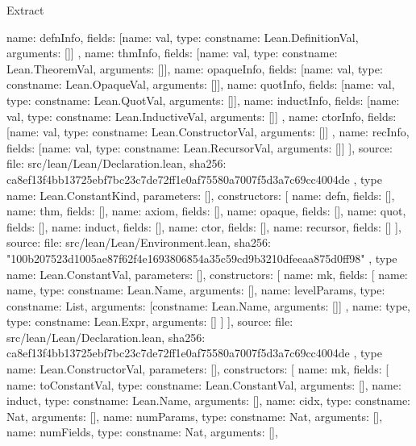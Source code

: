 \begin{lexlean}{Extract}
\begin{toolingmodule}
{{        {
          name: defnInfo,
          fields: [{name: val, type: const{name: Lean.DefinitionVal, arguments: []}}]
        },
        {name: thmInfo, fields: [{name: val, type: const{name: Lean.TheoremVal, arguments: []}}]},
        {name: opaqueInfo, fields: [{name: val, type: const{name: Lean.OpaqueVal, arguments: []}}]},
        {name: quotInfo, fields: [{name: val, type: const{name: Lean.QuotVal, arguments: []}}]},
        {
          name: inductInfo,
          fields: [{name: val, type: const{name: Lean.InductiveVal, arguments: []}}]
        },
        {
          name: ctorInfo,
          fields: [{name: val, type: const{name: Lean.ConstructorVal, arguments: []}}]
        },
        {name: recInfo, fields: [{name: val, type: const{name: Lean.RecursorVal, arguments: []}}]}
      ],
      source: {
        file: src/lean/Lean/Declaration.lean,
        sha256: ca8ef13f4bb13725ebf7bc23c7de72ff1e0af75580a7007f5d3a7c69cc4004de
      }
    },
    type{
      name: Lean.ConstantKind,
      parameters: [],
      constructors: [
        {name: defn, fields: []},
        {name: thm, fields: []},
        {name: axiom, fields: []},
        {name: opaque, fields: []},
        {name: quot, fields: []},
        {name: induct, fields: []},
        {name: ctor, fields: []},
        {name: recursor, fields: []}
      ],
      source: {
        file: src/lean/Lean/Environment.lean,
        sha256: "100b207523d1005ae87f62f4e1693806854a35c59cd9b3210dfeeaa875d0ff98"
      }
    },
    type{
      name: Lean.ConstantVal,
      parameters: [],
      constructors: [
        {
          name: mk,
          fields: [
            {name: name, type: const{name: Lean.Name, arguments: []}},
            {
              name: levelParams,
              type: const{name: List, arguments: [const{name: Lean.Name, arguments: []}]}
            },
            {name: type, type: const{name: Lean.Expr, arguments: []}}
          ]
        }
      ],
      source: {
        file: src/lean/Lean/Declaration.lean,
        sha256: ca8ef13f4bb13725ebf7bc23c7de72ff1e0af75580a7007f5d3a7c69cc4004de
      }
    },
    type{
      name: Lean.ConstructorVal,
      parameters: [],
      constructors: [
        {
          name: mk,
          fields: [
            {name: toConstantVal, type: const{name: Lean.ConstantVal, arguments: []}},
            {name: induct, type: const{name: Lean.Name, arguments: []}},
            {name: cidx, type: const{name: Nat, arguments: []}},
            {name: numParams, type: const{name: Nat, arguments: []}},
            {name: numFields, type: const{name: Nat, arguments: []}},
}}}
\end{toolingmodule}
\end{lexlean}
